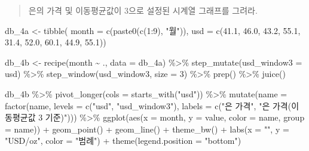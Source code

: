 \documentclass[
  letterpaper,
  DIV=11,
  numbers=noendperiod]{scrreprt}
\newenvironment{Shaded}{\begin{snugshade}}{\end{snugshade}}
\newcommand{\AttributeTok}[1]{\textcolor[rgb]{0.40,0.45,0.13}{#1}}
\newcommand{\DecValTok}[1]{\textcolor[rgb]{0.68,0.00,0.00}{#1}}
\newcommand{\FloatTok}[1]{\textcolor[rgb]{0.68,0.00,0.00}{#1}}
\newcommand{\FunctionTok}[1]{\textcolor[rgb]{0.28,0.35,0.67}{#1}}
\newcommand{\NormalTok}[1]{\textcolor[rgb]{0.00,0.23,0.31}{#1}}
\newcommand{\OtherTok}[1]{\textcolor[rgb]{0.00,0.23,0.31}{#1}}
\newcommand{\SpecialCharTok}[1]{\textcolor[rgb]{0.37,0.37,0.37}{#1}}
\newcommand{\StringTok}[1]{\textcolor[rgb]{0.13,0.47,0.30}{#1}}
\begin{document}

\begin{quote}
은의 가격 및 이동평균값이 3으로 설정된 시계열 그래프를 그려라.
\end{quote}

\begin{Shaded}
\begin{Highlighting}[]
\NormalTok{db\_4a }\OtherTok{\textless{}{-}} \FunctionTok{tibble}\NormalTok{(}
  \AttributeTok{month =} \FunctionTok{c}\NormalTok{(}\FunctionTok{paste0}\NormalTok{(}\FunctionTok{c}\NormalTok{(}\DecValTok{1}\SpecialCharTok{:}\DecValTok{9}\NormalTok{), }\StringTok{"월"}\NormalTok{)),}
  \AttributeTok{usd =}  \FunctionTok{c}\NormalTok{(}\FloatTok{41.1}\NormalTok{, }\FloatTok{46.0}\NormalTok{, }\FloatTok{43.2}\NormalTok{, }\FloatTok{55.1}\NormalTok{, }\FloatTok{31.4}\NormalTok{, }\FloatTok{52.0}\NormalTok{, }\FloatTok{60.1}\NormalTok{, }\FloatTok{44.9}\NormalTok{, }\FloatTok{55.1}\NormalTok{))}

\NormalTok{db\_4b }\OtherTok{\textless{}{-}} \FunctionTok{recipe}\NormalTok{(month }\SpecialCharTok{\textasciitilde{}}\NormalTok{ ., }\AttributeTok{data =}\NormalTok{ db\_4a) }\SpecialCharTok{\%\textgreater{}\%}
  \FunctionTok{step\_mutate}\NormalTok{(}\AttributeTok{usd\_window3 =}\NormalTok{ usd) }\SpecialCharTok{\%\textgreater{}\%}
  \FunctionTok{step\_window}\NormalTok{(usd\_window3, }\AttributeTok{size =} \DecValTok{3}\NormalTok{) }\SpecialCharTok{\%\textgreater{}\%}
  \FunctionTok{prep}\NormalTok{() }\SpecialCharTok{\%\textgreater{}\%} \FunctionTok{juice}\NormalTok{()}

\NormalTok{db\_4b }\SpecialCharTok{\%\textgreater{}\%} \FunctionTok{pivot\_longer}\NormalTok{(}\AttributeTok{cols =} \FunctionTok{starts\_with}\NormalTok{(}\StringTok{"usd"}\NormalTok{)) }\SpecialCharTok{\%\textgreater{}\%}
  \FunctionTok{mutate}\NormalTok{(}\AttributeTok{name =} \FunctionTok{factor}\NormalTok{(name, }\AttributeTok{levels =} \FunctionTok{c}\NormalTok{(}\StringTok{"usd"}\NormalTok{, }\StringTok{"usd\_window3"}\NormalTok{),}
                       \AttributeTok{labels =} \FunctionTok{c}\NormalTok{(}\StringTok{"은 가격"}\NormalTok{, }\StringTok{"은 가격(이동평균값 3 기준)"}\NormalTok{))) }\SpecialCharTok{\%\textgreater{}\%}
  \FunctionTok{ggplot}\NormalTok{(}\FunctionTok{aes}\NormalTok{(}\AttributeTok{x =}\NormalTok{ month, }\AttributeTok{y =}\NormalTok{ value, }\AttributeTok{color =}\NormalTok{ name, }\AttributeTok{group =}\NormalTok{ name)) }\SpecialCharTok{+}
  \FunctionTok{geom\_point}\NormalTok{() }\SpecialCharTok{+} 
  \FunctionTok{geom\_line}\NormalTok{() }\SpecialCharTok{+} \FunctionTok{theme\_bw}\NormalTok{() }\SpecialCharTok{+}
  \FunctionTok{labs}\NormalTok{(}\AttributeTok{x =} \StringTok{""}\NormalTok{, }\AttributeTok{y =} \StringTok{"USD/oz"}\NormalTok{, }\AttributeTok{color =} \StringTok{"범례"}\NormalTok{) }\SpecialCharTok{+}
  \FunctionTok{theme}\NormalTok{(}\AttributeTok{legend.position =} \StringTok{"bottom"}\NormalTok{)}
\end{Highlighting}
\end{Shaded}
\end{document}
